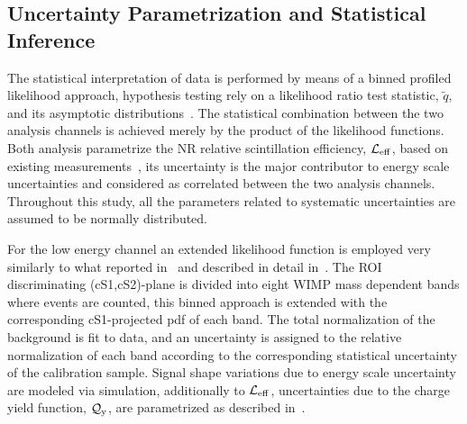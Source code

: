 
\subsection{Uncertainty Parametrization and Statistical Inference }
\label{sec:LikelihoodFunction}
The statistical interpretation of data is performed by means of a binned profiled likelihood approach, hypothesis testing rely on a likelihood ratio test statistic, $\tilde{q}$, 
and its asymptotic distributions~\cite{asympt}. The statistical combination between the two analysis channels is achieved merely by the product of the likelihood functions.
Both analysis parametrize the NR relative scintillation efficiency, $\mathcal{L}_{\mathrm{eff}}$, based on existing measurements~\cite{run8Result}, its uncertainty is the major contributor to energy 
scale uncertainties and considered as correlated between the two analysis channels.
Throughout this study, all the parameters related to systematic uncertainties are assumed to be normally distributed.

For the low energy channel an extended likelihood function is employed very similarly to what reported in~\cite{Aprile:2011hx} and described in detail in~\cite{xe100_run_combination}. 
The ROI discriminating (cS1,cS2)-plane is divided into eight WIMP mass dependent bands where events are counted, this binned approach is extended with the corresponding cS1-projected pdf of each band. The total normalization of the background is fit to data, and an uncertainty  is assigned to the relative normalization 
of each band according to the corresponding statistical uncertainty of the calibration sample.
Signal shape variations due to energy scale uncertainty are modeled via simulation, additionally to $\mathcal{L}_{\mathrm{eff}}$, uncertainties due to the charge 
yield function, $\mathcal{Q}_{\mathrm{y}}$, are parametrized as described in~\cite{QY}.

